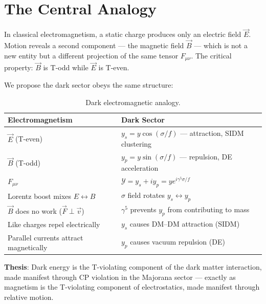 
\section{The Central Analogy}
\label{ch3:analogy}

In classical electromagnetism, a static charge produces only an electric field
$\vec{E}$. Motion reveals a second component — the magnetic field $\vec{B}$ —
which is not a new entity but a different projection of the same tensor $F_{\mu\nu}$.
The critical property: $\vec{B}$ is T-odd while $\vec{E}$ is T-even.

We propose the dark sector obeys the same structure:

\begin{table}[h!]
\centering
\caption{Dark electromagnetic analogy.}
\begin{tabular}{ll}
\toprule
Electromagnetism & Dark Sector \\
\midrule
$\vec{E}$ (T-even) & $y_s = y\cos(\sigma/f)$ — attraction, SIDM clustering \\
$\vec{B}$ (T-odd) & $y_p = y\sin(\sigma/f)$ — repulsion, DE acceleration \\
$F_{\mu\nu}$ & $\mathcal{Y} = y_s + iy_p = ye^{i\gamma^5\sigma/f}$ \\
Lorentz boost mixes $E \leftrightarrow B$ & $\sigma$ field rotates $y_s \leftrightarrow y_p$ \\
$\vec{B}$ does no work ($\vec{F}\perp\vec{v}$) & $\gamma^5$ prevents $y_p$ from contributing to mass \\
Like charges repel electrically & $y_s$ causes DM–DM attraction (SIDM) \\
Parallel currents attract magnetically & $y_p$ causes vacuum repulsion (DE) \\
\bottomrule
\end{tabular}
\end{table}

\textbf{Thesis}: Dark energy is the T-violating component of the dark matter
interaction, made manifest through CP violation in the Majorana sector ---
exactly as magnetism is the T-violating component of electrostatics,
made manifest through relative motion.

